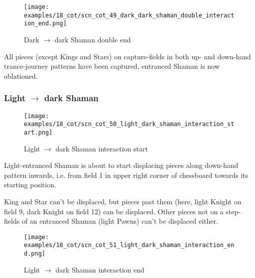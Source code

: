 \noindent
\begin{figure}[!h]
\texttt{[image: examples/18\_cot/scn\_cot\_49\_dark\_dark\_shaman\_double\_interaction\_end.png]}
\caption{Dark $\rightarrow$ dark Shaman double end}
\label{fig:scn_cot_49_dark_dark_shaman_double_interaction_end}
\end{figure}

All pieces (except Kings and Stars) on capture-fields in both up- and down-hand
trance-journey patterns have been captured, entranced Shaman is now oblationed.

\clearpage %

\subsubsection*{Light $\rightarrow$ dark Shaman}
\label{sec:Conquest of Tlalocan/Trance-journey/Interactions/Light --> dark Shaman}

\vspace*{-1.5\baselineskip}
\noindent
\begin{figure}[!h]
\texttt{[image: examples/18\_cot/scn\_cot\_50\_light\_dark\_shaman\_interaction\_start.png]}
\vspace*{-1.4\baselineskip}
\caption{Light $\rightarrow$ dark Shaman interaction start}
\label{fig:scn_cot_50_light_dark_shaman_interaction_start}
\end{figure}

\vspace*{-0.5\baselineskip}
Light-entranced Shaman is about to start displacing pieces along down-hand pattern
inwards, i.e. from field 1 in upper right corner of chessboard towards its starting
position.

King and Star can't be displaced, but pieces past them (here, light Knight on field 9,
dark Knight on field 12) can be displaced. Other pieces not on a step-fields of an
entranced Shaman (light Pawns) can't be displaced either.

\clearpage %

\noindent
\begin{figure}[!h]
\texttt{[image: examples/18\_cot/scn\_cot\_51\_light\_dark\_shaman\_interaction\_end.png]}
\caption{Light $\rightarrow$ dark Shaman interaction end}
\label{fig:scn_cot_51_light_dark_shaman_interaction_end}
\end{figure}

